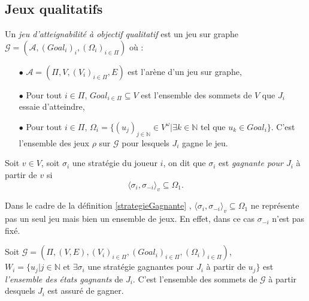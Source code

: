 

\subsection{Jeux qualitatifs}

	
	\begin{defi}
		Un \textit{jeu d'atteignabilité à objectif qualitatif} est un jeu sur graphe $\mathcal{G} = (\mathcal{A}, (Goal_{i})_{i},(\Omega _{i})_{i \in \Pi})$ où :
		\begin{enumerate}
			\item[$\bullet$] $\mathcal{A} = (\Pi,V,(V_{i})_{i \in \Pi}, E)$ est l'arène d'un jeu sur graphe,
			\item[$\bullet$] Pour tout $i \in \Pi$, $Goal_{i\in \Pi} \subseteq V $ est l'ensemble des sommets de $V$ que $J_{i}$ essaie d'atteindre,
			\item[$\bullet$] Pour tout $i \in \Pi$, $\Omega _{i} = \{(u_{j})_{j \in \mathbb{N}}\in V^{\omega}| \exists k \in \mathbb{N}$  tel que $u_{k}\in Goal_{i}\}$. C'est l'ensemble des jeux $\rho$ sur $\mathcal{G}$ pour lesquels $J_{i}$ gagne le jeu.
		\end{enumerate}	
	\end{defi}
	
	\label{strategieGagnante}
	\begin{defi}
		Soit $v \in V$, soit $\sigma _{i}$ une stratégie du joueur $i$, on dit que $\sigma _{i}$ est \textit{gagnante pour $J_{i}$} à partir de $v$ si 
		$$ \langle \sigma_{i}, \sigma_{-i} \rangle_v  \subseteq \Omega_{1}.$$
	\end{defi}
	
	\begin{rem}
		Dans le cadre de la définition \ref{strategieGagnante} , $ \langle \sigma_{i}, \sigma_{-i} \rangle_v  \subseteq \Omega_{1}$ ne représente pas un seul jeu mais bien un ensemble de jeux. En effet, dans ce cas $\sigma _{-i}$ n'est pas fixé.
	\end{rem}
	
	
	\begin{defi}$ $\\
		Soit $\mathcal{G} = (\Pi,(V,E),(V_{i})_{i \in \Pi}, (Goal_{i})_{i \in \Pi},(\Omega _{i})_{i \in \Pi})$,\\
		$W_{i} = \{ u_{j} |j\in \mathbb{N}$ et $\exists \sigma _{i}$ une stratégie gagnantes pour $J_{i}$ à partir de $u_{j}\}$ est \textit{l'ensemble des états gagnants} de $J_{i}$. C'est l'ensemble des sommets de $\mathcal{G}$ à partir desquels $J_{i}$ est assuré de gagner.
	\end{defi}
	

